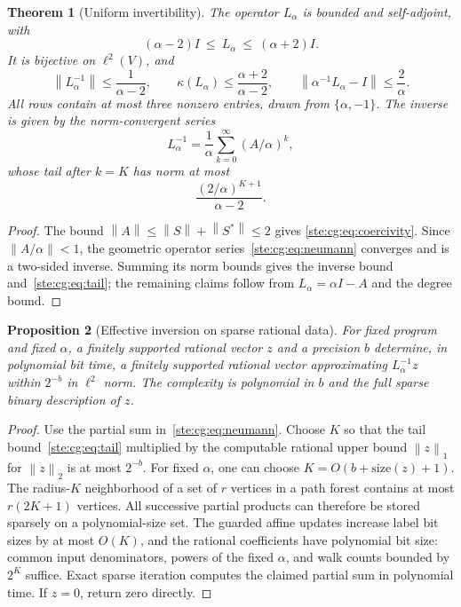\documentclass[11pt,letterpaper]{article}
\newtheorem{theorem}{Theorem}[section]
\newtheorem{proposition}[theorem]{Proposition}
\theoremstyle{definition}
\theoremstyle{remark}
\newcommand{\norm}[1]{\left\lVert #1\right\rVert}
\begin{document}
\begin{theorem}[Uniform invertibility]\label{ste:cg:thm:coercive}
The operator $L_\alpha$ is bounded and self-adjoint, with
\begin{equation}\label{ste:cg:eq:coercivity}
 (\alpha-2)I\ \le\ L_\alpha\ \le\ (\alpha+2)I.
\end{equation}
It is bijective on $\ell^2(V)$, and
\begin{equation}\label{ste:cg:eq:condition}
 \norm{L_\alpha^{-1}}\le\frac1{\alpha-2},\qquad
 \kappa(L_\alpha)\le\frac{\alpha+2}{\alpha-2},\qquad
 \norm{\alpha^{-1}L_\alpha-I}\le\frac2\alpha.
\end{equation}
All rows contain at most three nonzero entries, drawn from
$\{\alpha,-1\}$. The inverse is given by the norm-convergent series
\begin{equation}\label{ste:cg:eq:neumann}
 L_\alpha^{-1}=\frac1\alpha\sum_{k=0}^{\infty}(A/\alpha)^k,
\end{equation}
whose tail after $k=K$ has norm at most
\begin{equation}\label{ste:cg:eq:tail}
 \frac{(2/\alpha)^{K+1}}{\alpha-2}.
\end{equation}
\end{theorem}
\begin{proof}
The bound $\norm A\le\norm S+\norm{S^*}\le2$ gives
\eqref{ste:cg:eq:coercivity}. Since $\norm{A/\alpha}<1$, the geometric operator
series~\eqref{ste:cg:eq:neumann} converges and is a two-sided inverse. Summing its
norm bounds gives the inverse bound and~\eqref{ste:cg:eq:tail}; the remaining
claims follow from $L_\alpha=\alpha I-A$ and the degree bound.
\end{proof}

\begin{proposition}[Effective inversion on sparse rational data]\label{ste:cg:prop:effectiveinverse}
For fixed program and fixed $\alpha$, a finitely supported rational vector
$z$ and a precision $b$ determine, in polynomial bit time, a finitely
supported rational vector approximating $L_\alpha^{-1}z$ within $2^{-b}$
in $\ell^2$ norm. The complexity is polynomial in $b$ and the full sparse
binary description of $z$.
\end{proposition}
\begin{proof}
Use the partial sum in~\eqref{ste:cg:eq:neumann}. Choose $K$ so that the tail
bound~\eqref{ste:cg:eq:tail} multiplied by the computable rational upper bound
$\norm z_1$ for $\norm z_2$ is at most $2^{-b}$. For fixed $\alpha$, one
can choose $K=O(b+\mathrm{size}(z)+1)$. The radius-$K$ neighborhood of a
set of $r$ vertices in a path forest contains at most $r(2K+1)$ vertices.
All successive partial products can therefore be stored sparsely on a
polynomial-size set. The guarded affine updates increase label bit sizes
by at most $O(K)$, and the rational coefficients have polynomial bit size:
common input denominators, powers of the fixed $\alpha$, and walk counts
bounded by $2^K$ suffice. Exact sparse iteration computes the claimed
partial sum in polynomial time. If $z=0$, return zero directly.
\end{proof}
\end{document}
